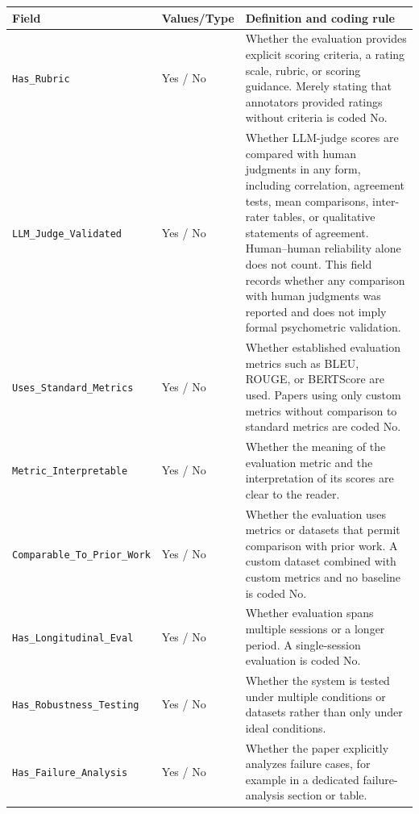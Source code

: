 \begin{table}[p]
\centering
\begin{tabular}{p{4.3cm}p{1.9cm}p{8.5cm}}
\toprule
\textbf{Field} & \textbf{Values/Type} & \textbf{Definition and coding rule} \\
\midrule

\texttt{Has\_Rubric}
&
Yes / No
&
Whether the evaluation provides explicit scoring criteria, a rating scale, rubric, or scoring guidance. Merely stating that annotators provided ratings without criteria is coded No.
\\
\midrule

\texttt{LLM\_Judge\_Validated}
&
Yes / No
&
Whether LLM-judge scores are compared with human judgments in any form, including correlation, agreement tests, mean comparisons, inter-rater tables, or qualitative statements of agreement. Human--human reliability alone does not count. This field records whether any comparison with human judgments was reported and does not imply formal psychometric validation.
\\
\midrule

\texttt{Uses\_Standard\_Metrics}
&
Yes / No
&
Whether established evaluation metrics such as BLEU, ROUGE, or BERTScore are used. Papers using only custom metrics without comparison to standard metrics are coded No.
\\
\midrule

\texttt{Metric\_Interpretable}
&
Yes / No
&
Whether the meaning of the evaluation metric and the interpretation of its scores are clear to the reader.
\\
\midrule

\texttt{Comparable\_To\_Prior\_Work}
&
Yes / No
&
Whether the evaluation uses metrics or datasets that permit comparison with prior work. A custom dataset combined with custom metrics and no baseline is coded No.
\\
\midrule

\texttt{Has\_Longitudinal\_Eval}
&
Yes / No
&
Whether evaluation spans multiple sessions or a longer period. A single-session evaluation is coded No.
\\
\midrule

\texttt{Has\_Robustness\_Testing}
&
Yes / No
&
Whether the system is tested under multiple conditions or datasets rather than only under ideal conditions.
\\
\midrule

\texttt{Has\_Failure\_Analysis}
&
Yes / No
&
Whether the paper explicitly analyzes failure cases, for example in a dedicated failure-analysis section or table.
\\
\midrule


\end{tabular}
\end{table}
